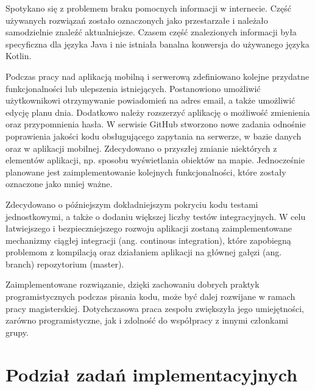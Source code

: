 \documentclass[10pt,twoside,a4paper]{report}
\begin{document}
\par Spotykano się z problemem braku pomocnych informacji w internecie. Część używanych rozwiązań zostało oznaczonych jako przestarzałe i należało samodzielnie znaleźć aktualniejsze. Czasem część znalezionych informacji była specyficzna dla języka Java i nie istniała banalna konwersja do używanego języka Kotlin.

\par Podczas pracy nad aplikacją mobilną i serwerową zdefiniowano kolejne przydatne funkcjonalności lub ulepszenia istniejących. Postanowiono umożliwić użytkownikowi otrzymywanie powiadomień na adres email, a także umożliwić edycję planu dnia. Dodatkowo należy rozszerzyć aplikację o możliwość zmienienia oraz przypomnienia hasła. W serwisie GitHub stworzono nowe zadania odnośnie poprawienia jakości kodu obsługującego zapytania na serwerze, w bazie danych oraz w aplikacji mobilnej. Zdecydowano o przyszłej zmianie niektórych z elementów aplikacji, np. sposobu wyświetlania obiektów na mapie. Jednocześnie planowane jest zaimplementowanie kolejnych funkcjonalności, które zostały oznaczone jako mniej ważne.

\par Zdecydowano o późniejszym dokładniejszym pokryciu kodu testami jednostkowymi, a także o dodaniu większej liczby testów integracyjnych. W celu łatwiejszego i bezpieczniejszego rozwoju aplikacji zostaną zaimplementowane mechanizmy ciągłej integracji (ang. continous integration), które zapobiegną problemom z kompilacją oraz działaniem aplikacji na głównej gałęzi (ang. branch) repozytorium (master).

\par Zaimplementowane rozwiązanie, dzięki zachowaniu dobrych praktyk programistycznych podczas pisania kodu, może być dalej rozwijane w ramach pracy magisterskiej. Dotychczasowa praca zespołu zwiększyła jego umiejętności, zarówno programistyczne, jak i zdolność do współpracy z innymi członkami grupy.

\chapter*{Podział zadań implementacyjnych}

\end{document}
